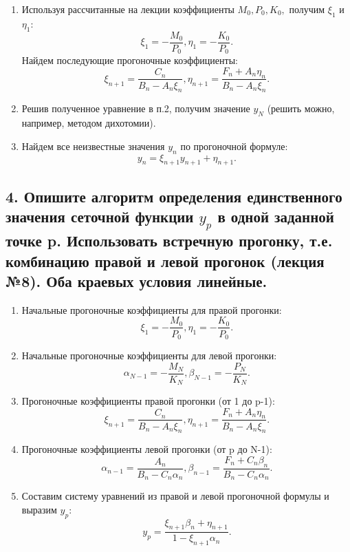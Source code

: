 \begin{enumerate}
	\item Используя рассчитанные на лекции коэффициенты $M_0, P_0, K_0,$ получим $\xi_1$ и $\eta_1$:
	$$ \xi_1 = -\frac{M_0}{P_0}, \eta_1 = -\frac{K_0}{P_0}.$$ Найдем последующие прогоночные коэффициенты: $$ \xi_{n+1} = \frac{C_n}{B_n - A_n \xi_n}, \eta_{n+1} = \frac{F_n + A_n \eta_n}{B_n - A_n \xi_n}.$$ 
	\item Решив полученное уравнение в п.2, получим значение $y_N$ (решить можно, например, методом дихотомии).
	\item Найдем все неизвестные значения $y_n$ по прогоночной формуле: $$y_n = \xi_{n+1}y_{n+1} + \eta_{n+1} .$$
\end{enumerate}

\subsection*{4. Опишите алгоритм определения единственного значения сеточной функции $y_p$ в одной заданной точке p. Использовать встречную прогонку, т.е. комбинацию правой и левой прогонок (лекция №8). Оба краевых условия линейные. }

\begin{enumerate}
	\item Начальные прогоночные коэффициенты для правой прогонки:
	$$ \xi_1 = -\frac{M_0}{P_0}, \eta_1 = -\frac{K_0}{P_0}.$$
	\item Начальные прогоночные коэффициенты для левой прогонки:
	$$ \alpha_{N-1} = -\frac{M_N}{K_N}, \beta_{N-1} = -\frac{P_N}{K_N }.$$
	\item Прогоночные коэффициенты правой прогонки (от 1 до p-1):
	$$ \xi_{n+1} = \frac{C_n}{B_n - A_n \xi_n}, \eta_{n+1} = \frac{F_n + A_n \eta_n}{B_n - A_n \xi_n} .$$
	\item Прогоночные коэффициенты левой прогонки (от p до N-1):
	$$ \alpha_{n-1} = \frac{A_n}{B_n - C_n \alpha_n}, \beta_{n-1} = \frac{F_n + C_n \beta_n}{B_n - C_n \alpha_n} .$$
	\item Составим систему уравнений из правой и левой прогоночной формулы и выразим $y_p$:
	$$ y_p = \frac{\xi_{n+1} \beta_n + \eta_{n+1}}{1 - \xi_{n+1} \alpha_n} .$$
\end{enumerate}

